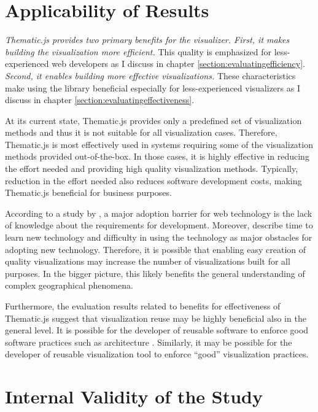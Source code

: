 \section{Applicability of Results}

\emph{Thematic.js provides two primary benefits for the visualizer. First, it makes building the visualization more efficient.} This quality is emphasized for less-experienced web developers as I discuss in chapter \ref{section:evaluatingefficiency}. \emph{Second, it enables building more effective visualizations.} These characteristics make using the library beneficial especially for less-experienced visualizers as I discuss in chapter \ref{section:evaluatingeffectiveness}.

At its current state, Thematic.js provides only a predefined set of visualization methods and thus it is not suitable for all visualization cases. Therefore, Thematic.js is most effectively used in systems requiring some of the visualization methods provided out-of-the-box. In those cases, it is highly effective in reducing the effort needed and providing high quality visualization methods. Typically, reduction in the effort needed also reduces software development costs, making Thematic.js beneficial for business purposes. 

According to a study by \citet{nambisan_technical_1999}, a major adoption barrier for web technology is the lack of knowledge about the requirements for development. Moreover, \citet{butler_barriers_2002} describe time to learn new technology and difficulty in using the technology as major obstacles for adopting new technology. Therefore, it is possible that enabling easy creation of quality visualizations may increase the number of visualizations built for all purposes. In the bigger picture, this likely benefits the general understanding of complex geographical phenomena.

Furthermore, the evaluation results related to benefits for effectiveness of Thematic.js suggest that visualization reuse may be highly beneficial also in the general level. It is possible for the developer of reusable software to enforce good software practices such as architecture \citep{mohagheghi_quality_2007}. Similarly, it may be possible for the developer of reusable visualization tool to enforce ``good'' visualization practices.

\section{Internal Validity of the Study}
\label{section:internalvalidity}

